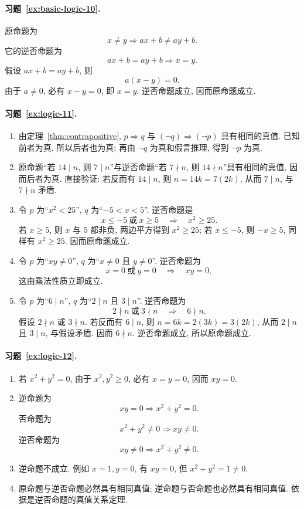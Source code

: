 \documentclass[usesamecnt, thmcnt=section, lang=cn, newtx, 10pt, scheme=chinese]{elegantbook}
\begin{document}
\paragraph*{习题~\ref{ex:basic-logic-10}.}
原命题为
\[
 x\neq y\Rightarrow ax+b\neq ay+b.
\]
它的逆否命题为
\[
 ax+b=ay+b\Rightarrow x=y.
\]
假设 $ax+b=ay+b$, 则
\[
 a(x-y)=0.
\]
由于 $a\neq0$, 必有 $x-y=0$, 即 $x=y$. 逆否命题成立, 因而原命题成立.

\paragraph*{习题~\ref{ex:logic-11}.}
\begin{enumerate}[label=\rm(\arabic*)]
  \item 由定理~\ref{thm:contrapositive}, $p\Rightarrow q$ 与 $(\neg q)\Rightarrow(\neg p)$ 具有相同的真值. 已知前者为真, 所以后者也为真; 再由 $\neg q$ 为真和假言推理, 得到 $\neg p$ 为真.

  \item 原命题``若 $14\mid n$, 则 $7\mid n$''与逆否命题``若 $7\nmid n$, 则 $14\nmid n$''具有相同的真值, 因而后者为真. 直接验证: 若反而有 $14\mid n$, 则 $n=14k=7(2k)$, 从而 $7\mid n$, 与 $7\nmid n$ 矛盾.

  \item 令 $p$ 为``$x^2<25$'', $q$ 为``$-5<x<5$''. 逆否命题是
  \[
    x\leq-5\ \text{或}\ x\geq5\quad\Rightarrow\quad x^2\geq25.
  \]
  若 $x\geq5$, 则 $x$ 与 $5$ 都非负, 两边平方得到 $x^2\geq25$; 若 $x\leq-5$, 则 $-x\geq5$, 同样有 $x^2\geq25$. 因而原命题成立.

  \item 令 $p$ 为``$xy\neq0$'', $q$ 为``$x\neq0$ 且 $y\neq0$''. 逆否命题为
  \[
    x=0\ \text{或}\ y=0\quad\Rightarrow\quad xy=0,
  \]
  这由乘法性质立即成立.

  \item 令 $p$ 为``$6\mid n$'', $q$ 为``$2\mid n$ 且 $3\mid n$''. 逆否命题为
  \[
    2\nmid n\ \text{或}\ 3\nmid n\quad\Rightarrow\quad6\nmid n.
  \]
  假设 $2\nmid n$ 或 $3\nmid n$. 若反而有 $6\mid n$, 则 $n=6k=2(3k)=3(2k)$, 从而 $2\mid n$ 且 $3\mid n$, 与假设矛盾. 因而 $6\nmid n$. 逆否命题成立, 所以原命题成立.
\end{enumerate}

\paragraph*{习题~\ref{ex:logic-12}.}
\begin{enumerate}[label=\rm(\arabic*)]
  \item 若 $x^2+y^2=0$, 由于 $x^2,y^2\geq0$, 必有 $x=y=0$, 因而 $xy=0$.
  \item 逆命题为
  \[
    xy=0\Rightarrow x^2+y^2=0.
  \]
  否命题为
  \[
    x^2+y^2\neq0\Rightarrow xy\neq0.
  \]
  逆否命题为
  \[
    xy\neq0\Rightarrow x^2+y^2\neq0.
  \]
  \item 逆命题不成立. 例如 $x=1,y=0$, 有 $xy=0$, 但 $x^2+y^2=1\neq0$.
  \item 原命题与逆否命题必然具有相同真值; 逆命题与否命题也必然具有相同真值. 依据是逆否命题的真值关系定理.
\end{enumerate}
\end{document}
